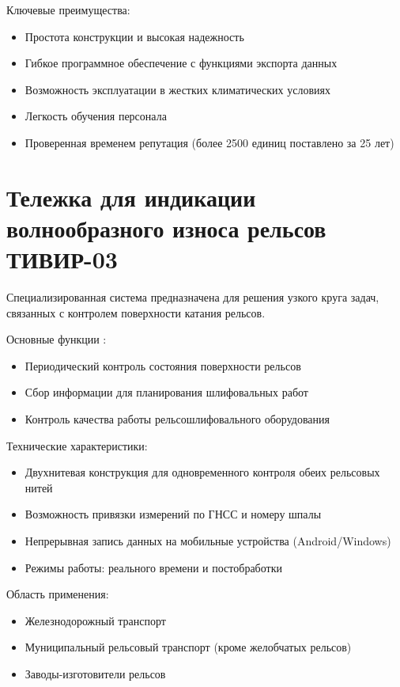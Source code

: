 Ключевые преимущества:
\begin{itemize}
	\item Простота конструкции и высокая надежность
	\item Гибкое программное обеспечение с функциями экспорта данных
	\item Возможность эксплуатации в жестких климатических условиях
	\item Легкость обучения персонала
	\item Проверенная временем репутация (более 2500 единиц поставлено за 25 лет)
\end{itemize}


\section{Тележка для индикации волнообразного износа рельсов ТИВИР-03}
\label{sec:tivir03}

Специализированная система предназначена для решения узкого круга задач, связанных с контролем поверхности катания рельсов.

Основные функции \cite{website_tiwir03}:
\begin{itemize}
	\item Периодический контроль состояния поверхности рельсов
	\item Сбор информации для планирования шлифовальных работ
	\item Контроль качества работы рельсошлифовального оборудования
\end{itemize}

Технические характеристики:
\begin{itemize}
	\item Двухнитевая конструкция для одновременного контроля обеих рельсовых нитей
	\item Возможность привязки измерений по ГНСС и номеру шпалы
	\item Непрерывная запись данных на мобильные устройства (Android/Windows)
	\item Режимы работы: реального времени и постобработки
\end{itemize}

Область применения:
\begin{itemize}
	\item Железнодорожный транспорт
	\item Муниципальный рельсовый транспорт (кроме желобчатых рельсов)
	\item Заводы-изготовители рельсов
\end{itemize}

